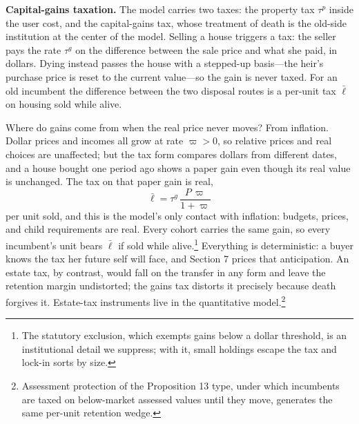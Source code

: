 \documentclass[11pt]{article}
\newcommand{\1}{\mathbf 1}
\begin{document}
\textbf{Capital-gains taxation.} The model carries two taxes: the property tax $\tau^p$ inside the user cost, and the capital-gains tax, whose treatment of death is the old-side institution at the center of the model. Selling a house triggers a tax: the seller pays the rate $\tau^g$ on the difference between the sale price and what she paid, in dollars. Dying instead passes the house with a stepped-up basis---the heir's purchase price is reset to the current value---so the gain is never taxed. For an old incumbent the difference between the two disposal routes is a per-unit tax $\bar\ell$ on housing sold while alive.

Where do gains come from when the real price never moves? From inflation. Dollar prices and incomes all grow at rate $\varpi>0$, so relative prices and real choices are unaffected; but the tax form compares dollars from different dates, and a house bought one period ago shows a paper gain even though its real value is unchanged. The tax on that paper gain is real,
\[
\bar\ell=\tau^g\,\frac{P\,\varpi}{1+\varpi}
\]
per unit sold, and this is the model's only contact with inflation: budgets, prices, and child requirements are real. Every cohort carries the same gain, so every incumbent's unit bears $\bar\ell$ if sold while alive.\footnote{The statutory exclusion, which exempts gains below a dollar threshold, is an institutional detail we suppress; with it, small holdings escape the tax and lock-in sorts by size.} Everything is deterministic: a buyer knows the tax her future self will face, and Section 7 prices that anticipation. An estate tax, by contrast, would fall on the transfer in any form and leave the retention margin undistorted; the gains tax distorts it precisely because death forgives it. Estate-tax instruments live in the quantitative model.\footnote{Assessment protection of the Proposition 13 type, under which incumbents are taxed on below-market assessed values until they move, generates the same per-unit retention wedge.}
\end{document}
